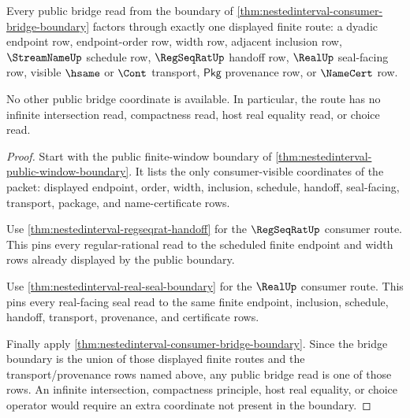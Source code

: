 \begin{theorem}
\label{thm:nestedinterval-consumer-bridge-finite-route-exactness}
Every public bridge read from the boundary of
\autoref{thm:nestedinterval-consumer-bridge-boundary} factors through exactly
one displayed finite route: a dyadic endpoint row, endpoint-order row, width
row, adjacent inclusion row, $\StreamNameUp$ schedule row, $\RegSeqRatUp$
handoff row, $\RealUp$ seal-facing row, visible $\hsame$ or $\Cont$ transport,
$\mathsf{Pkg}$ provenance row, or $\NameCert$ row.

No other public bridge coordinate is available. In particular, the route has no
infinite intersection read, compactness read, host real equality read, or choice
read.
\end{theorem}
\begin{proof}
Start with the public finite-window boundary of
\autoref{thm:nestedinterval-public-window-boundary}. It lists the only
consumer-visible coordinates of the packet: displayed endpoint, order, width,
inclusion, schedule, handoff, seal-facing, transport, package, and
name-certificate rows.

Use \autoref{thm:nestedinterval-regseqrat-handoff} for the
$\RegSeqRatUp$ consumer route. This pins every regular-rational read to the
scheduled finite endpoint and width rows already displayed by the public
boundary.

Use \autoref{thm:nestedinterval-real-seal-boundary} for the $\RealUp$ consumer
route. This pins every real-facing seal read to the same finite endpoint,
inclusion, schedule, handoff, transport, provenance, and certificate rows.

Finally apply \autoref{thm:nestedinterval-consumer-bridge-boundary}. Since the
bridge boundary is the union of those displayed finite routes and the
transport/provenance rows named above, any public bridge read is one of those
rows. An infinite intersection, compactness principle, host real equality, or
choice operator would require an extra coordinate not present in the boundary.
\end{proof}

